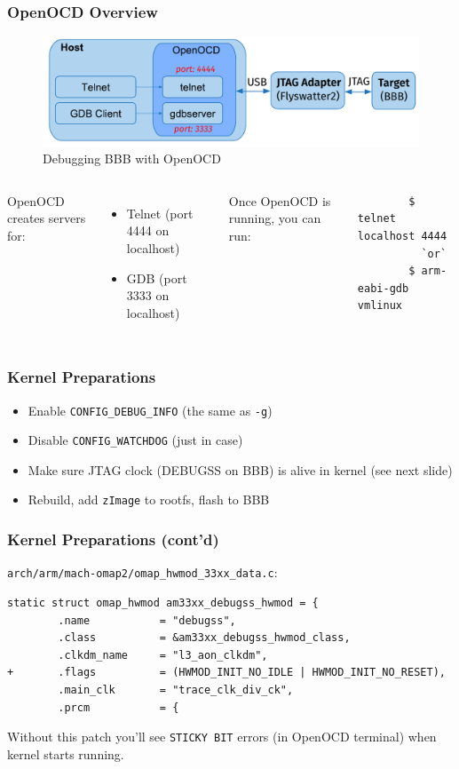 \begin{frame}[containsverbatim]
  \frametitle{OpenOCD Overview}
  \begin{figure}
    \centering
    \includegraphics[scale=0.6]{images/openocd.pdf}
    \caption{Debugging BBB with OpenOCD}
  \end{figure}
  \begin{columns}
      OpenOCD creates servers for:
      \begin{itemize}
        \item Telnet (port 4444 on localhost)
        \item GDB (port 3333 on localhost)
      \end{itemize}
      Once OpenOCD is running, you can run:
      \begin{lstlisting}
        $ telnet localhost 4444
          `or`
        $ arm-eabi-gdb vmlinux
      \end{lstlisting}
  \end{columns}
\end{frame}

\begin{frame}
  \frametitle{Kernel Preparations}
  \begin{itemize}
    \item Enable \texttt{CONFIG\_DEBUG\_INFO} (the same as \texttt{-g})
    \item Disable \texttt{CONFIG\_WATCHDOG} (just in case)
    \item Make sure JTAG clock (DEBUGSS on BBB) is alive in kernel
          (see next slide)
    \item Rebuild, add \texttt{zImage} to rootfs, flash to BBB
  \end{itemize}
\end{frame}

\begin{frame}[containsverbatim]
  \frametitle{Kernel Preparations (cont'd)}
  \texttt{arch/arm/mach-omap2/omap\_hwmod\_33xx\_data.c}:
  \begin{lstlisting}
static struct omap_hwmod am33xx_debugss_hwmod = {
        .name           = "debugss",
        .class          = &am33xx_debugss_hwmod_class,
        .clkdm_name     = "l3_aon_clkdm",
+       .flags          = (HWMOD_INIT_NO_IDLE | HWMOD_INIT_NO_RESET),
        .main_clk       = "trace_clk_div_ck",
        .prcm           = {
  \end{lstlisting}
  Without this patch you'll see \texttt{STICKY BIT} errors (in OpenOCD terminal)
  when kernel starts running.
\end{frame}

